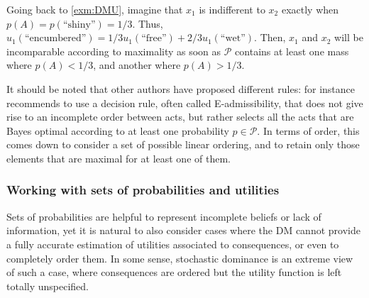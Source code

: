 \documentclass[french, english]{llncs}
\begin{document}
\begin{example}
	Going back to \cref{exm:DMU}, imagine that $x_1$ is indifferent to $x_2$ exactly when $p(A) = p(\text{“shiny”}) = 1/3$. Thus, $u_1(\text{“encumbered”}) = 1/3 u_1(\text{“free”}) + 2/3 u_1(\text{“wet”})$. Then, $x_1$ and $x_2$ will be incomparable according to maximality as soon as $\mathcal{P}$ contains at least one mass where $p(A) < 1/3$, and another where $p(A) > 1/3$.
\end{example}

It should be noted that other authors have proposed different rules: for instance \citet{levi_enterprise_1983} recommends to use a decision rule, often called E-admissibility, that does not give rise to an incomplete order between acts, but rather selects all the acts that are Bayes optimal according to at least one probability $p \in \mathcal{P}$. In terms of order, this comes down to consider a set of possible linear ordering, and to retain only those elements that are maximal for at least one of them.


\subsubsection{Working with sets of probabilities and utilities}

Sets of probabilities are helpful to represent incomplete beliefs or lack of information, yet it is natural to also consider cases where the \ac{DM} cannot provide a fully accurate estimation of utilities associated to consequences, or even to completely order them. In some sense, stochastic dominance is an extreme view of such a case, where consequences are ordered but the utility function is left totally unspecified. 
	
\end{document}

